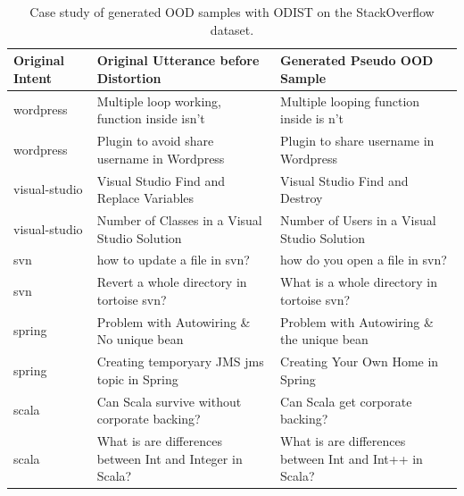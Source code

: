 \documentclass[11pt]{article}
\begin{document}
\begin{table}
\begin{center}
\small
\begin{tabular}{  l|L{170pt} |L{170pt}} 
\toprule
   \textbf{Original Intent} & \textbf{Original Utterance before Distortion} & \textbf{Generated Pseudo OOD Sample}  \\ 
\midrule
wordpress & Multiple loop working, function inside isn't &Multiple looping function inside is n't \\
\midrule
wordpress & Plugin to avoid share username in Wordpress & Plugin to share username in Wordpress \\
\midrule
visual-studio & Visual Studio Find and Replace Variables &  Visual Studio Find and Destroy \\
\midrule
visual-studio & Number of Classes in a Visual Studio Solution & Number of Users in a Visual Studio Solution \\
\midrule
svn & how to update a file in svn? & how do you open a file in svn? \\
\midrule
svn & Revert a whole directory in tortoise svn? & What is a whole directory in tortoise svn? \\
\midrule
spring & Problem with Autowiring \& No unique bean & Problem with Autowiring \& the unique bean \\
\midrule
spring & Creating temporyary JMS jms topic in Spring & Creating Your Own Home in Spring \\
\midrule
scala & Can Scala survive without corporate backing? & Can Scala get corporate backing? \\
\midrule
scala & What is are differences between Int and Integer in Scala? & What is are differences between Int and Int++ in Scala? \\
\bottomrule
\end{tabular}
\end{center}
\caption{Case study of generated OOD samples with ODIST on the StackOverflow dataset.}
\label{tab:review_ood_stack}
\end{table}
\end{document}
